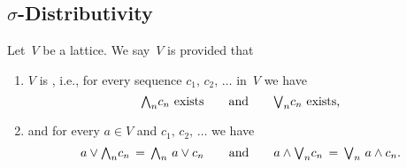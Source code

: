 \documentclass[main.tex]{subfiles}
\begin{document}
\subsection{$\sigma$-Distributivity}
\label{SS:sigma-distributive}
%
% 
\begin{dfn}
\label{D:sigma-distributive}
Let~$V$ be a lattice.
We say~$V$ is
provided that
\begin{enumerate}
\item
$V$ is , i.e.,
for every sequence $c_1,\,c_2,\,\dotsc$ in~$V$
we have 
\begin{equation*}
\text{ $\textstyle{\bigwedge}_n c_n$ exists\qquad and\qquad $\textstyle{\bigvee}_n c_n$ exists, }
\end{equation*}
\item
and for every  $a\in V$ and $c_1,\,c_2,\,\dotsc$
we have
\begin{equation*}
a \vee \textstyle{\bigwedge}_n c_n \,=\, \textstyle{\bigwedge}_n\  a\vee c_n
\qquad\text{and}\qquad
a \wedge \textstyle{\bigvee}_n c_n \,=\, \textstyle{\bigvee}_n\  a\wedge c_n.
\end{equation*}
\end{enumerate}
\end{dfn}
\end{document}
